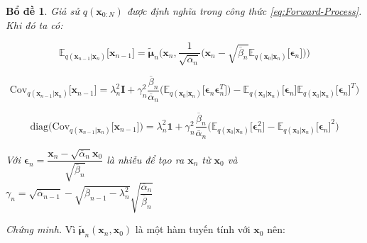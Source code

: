 \documentclass[14pt, a4paper]{article}
\numberwithin{equation}{section}
\numberwithin{figure}{section}
\newtheorem{bd}{Bổ đề}
\numberwithin{dl}{section}
\numberwithin{md}{section}
\numberwithin{bd}{section}
\numberwithin{dn}{section}
\numberwithin{hq}{section}
\begin{document}
    \begin{bd} \label{bd:Mean-Covariance}
        Giả sử $q(\boldsymbol{x}_{0:N})$ được định nghĩa trong công thức \ref{eq:Forward-Process}. Khi đó ta có:

        \begin{equation*}
            \mathbb{E}_{q(\boldsymbol{x}_{n-1} \vert \boldsymbol{x}_n)} \lbrack \boldsymbol{x}_{n-1} \rbrack = \tilde{\boldsymbol{\mu}}_n \Big( \boldsymbol{x}_n, \dfrac{1}{\sqrt{\overline{\alpha}_n}} \big( \boldsymbol{x}_n - \sqrt{\overline{\beta}_n} \mathbb{E}_{q(\boldsymbol{x}_0 \vert \boldsymbol{x}_n)} \lbrack \boldsymbol{\epsilon}_n \rbrack \big) \Big)
        \end{equation*}

        \begin{equation*}
            \mathrm{Cov}_{q(\boldsymbol{x}_{n-1} \vert \boldsymbol{x}_n)} \lbrack \boldsymbol{x}_{n-1} \rbrack = \lambda_n^2 \boldsymbol{I} + \gamma_n^2 \dfrac{\overline{\beta}_n}{\overline{\alpha}_n} \big( \mathbb{E}_{q(\boldsymbol{x}_0 \vert \boldsymbol{x}_n)} \lbrack \boldsymbol{\epsilon}_n \boldsymbol{\epsilon}_n^T \rbrack \big) - \mathbb{E}_{q(\boldsymbol{x}_0 \vert \boldsymbol{x}_n)} \lbrack \boldsymbol{\epsilon}_n \rbrack \mathbb{E}_{q(\boldsymbol{x}_0 \vert \boldsymbol{x}_n)} \lbrack \boldsymbol{\epsilon}_n \rbrack^T \big)
        \end{equation*}

        \begin{equation*}
            \mathrm{diag} \big( \mathrm{Cov}_{q(\boldsymbol{x}_{n-1} \vert \boldsymbol{x}_n)} \lbrack \boldsymbol{x}_{n-1} \rbrack \big) = \lambda_n^2 \boldsymbol{1} + \gamma_n^2 \dfrac{\overline{\beta}_n}{\overline{\alpha}_n} \big( \mathbb{E}_{q(\boldsymbol{x}_0 \vert \boldsymbol{x}_n)} \lbrack \boldsymbol{\epsilon}_n^2 \rbrack - \mathbb{E}_{q(\boldsymbol{x}_0 \vert \boldsymbol{x}_n)} \lbrack \boldsymbol{\epsilon}_n \rbrack^2 \big)
        \end{equation*}

        Với $\boldsymbol{\epsilon}_n = \dfrac{\boldsymbol{x}_n - \sqrt{\overline{\alpha}_n} \boldsymbol{x}_0}{\sqrt{\overline{\beta}_n}}$ là nhiễu để tạo ra $\boldsymbol{x}_n$ từ $\boldsymbol{x}_0$ và $\gamma_n = \sqrt{\overline{\alpha}_{n-1}} - \sqrt{\overline{\beta}_{n-1} - \lambda_n^2} \sqrt{\dfrac{\overline{\alpha}_n}{\overline{\beta}_n}}$
    \end{bd}

    \textit{Chứng minh.}
    Vì $\tilde{\boldsymbol{\mu}}_n (\boldsymbol{x}_n, \boldsymbol{x}_0)$ là một hàm tuyến tính với $\boldsymbol{x}_0$ nên:
\end{document}
